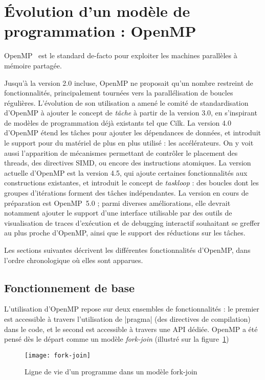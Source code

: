 \section{Évolution d'un modèle de programmation : OpenMP}\label{sec:context:openmp}

OpenMP~\cite{openmp45} est le standard de-facto pour exploiter les machines parallèles à mémoire partagée.

Jusqu'à la version 2.0 incluse, OpenMP ne proposait qu'un nombre restreint de fonctionnalités, principalement tournées vers la parallélisation de boucles régulières.
L'évolution de son utilisation a amené le comité de standardisation d'OpenMP à ajouter le concept de \emph{tâche} à partir de la version 3.0, en s'inspirant de modèles de programmation déjà existants tel que Cilk.
La version 4.0 d'OpenMP étend les tâches pour ajouter les dépendances de données, et introduit le support pour du matériel de plus en plus utilisé : les accélérateurs.
On y voit aussi l'apparition de mécanismes permettant de contrôler le placement des threads, des directives SIMD, ou encore des instructions atomiques.
La version actuelle d'OpenMP est la version 4.5, qui ajoute certaines fonctionnalités aux constructions existantes, et introduit le concept de \emph{taskloop} : des boucles dont les groupes d'itérations forment des tâches indépendantes.
La version en cours de préparation est OpenMP~5.0 ; parmi diverses améliorations, elle devrait notamment ajouter le support d'une interface utilisable par des outils de visualisation de traces d'exécution et de debugging interactif souhaitant se greffer au plus proche d'OpenMP, ainsi que le support des réductions sur les tâches.

Les sections suivantes décrivent les différentes fonctionnalités d'OpenMP, dans l'ordre chronologique où elles sont apparues.

\subsection{Fonctionnement de base}



L'utilisation d'OpenMP repose sur deux ensembles de fonctionnalités : le premier est accessible à travers l'utilisation de |pragma| (des directives de compilation) dans le code, et le second est accessible à travers une API dédiée.
OpenMP a été pensé dès le départ comme un modèle \emph{fork-join} (illustré sur la figure~\ref{fig:context:fork-join})

\begin{figure}[ht]
  \centering
  \texttt{[image: fork-join]}
  \caption{Ligne de vie d'un programme dans un modèle fork-join}\label{fig:context:fork-join}
\end{figure}

